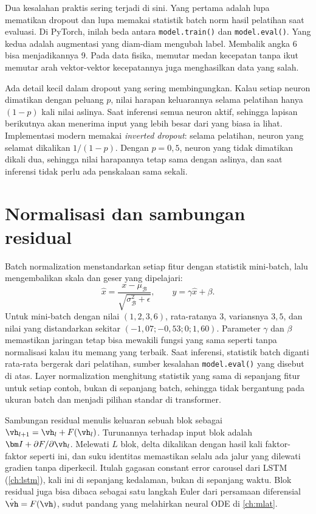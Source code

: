 Dua kesalahan praktis sering terjadi di sini. Yang pertama adalah lupa mematikan dropout dan lupa
memakai statistik batch norm hasil pelatihan saat evaluasi. Di PyTorch, inilah beda antara
\texttt{model.train()} dan \texttt{model.eval()}. Yang kedua adalah augmentasi yang diam-diam
mengubah label. Membalik angka 6 bisa menjadikannya 9. Pada data fisika, memutar medan kecepatan
tanpa ikut memutar arah vektor-vektor kecepatannya juga menghasilkan data yang salah.

Ada detail kecil dalam dropout yang sering membingungkan. Kalau setiap neuron dimatikan dengan peluang $p$, nilai harapan
keluarannya selama pelatihan hanya $(1-p)$ kali nilai aslinya. Saat inferensi semua neuron aktif, sehingga lapisan
berikutnya akan menerima input yang lebih besar dari yang biasa ia lihat. Implementasi modern memakai \emph{inverted
dropout}: selama pelatihan, neuron yang selamat dikalikan $1/(1-p)$. Dengan $p=0{,}5$, neuron yang tidak dimatikan dikali dua,
sehingga nilai harapannya tetap sama dengan aslinya, dan saat inferensi tidak perlu ada penskalaan sama sekali.

\section{Normalisasi dan sambungan residual}

Batch normalization \citep{ioffe2015} menstandarkan setiap fitur dengan statistik mini-batch, lalu mengembalikan skala dan
geser yang dipelajari:
\begin{equation}
\hat x=\frac{x-\mu_{\mathcal B}}{\sqrt{\sigma^2_{\mathcal B}+\epsilon}},\qquad y=\gamma\hat x+\beta .
\end{equation}
Untuk mini-batch dengan nilai $(1,2,3,6)$, rata-ratanya $3$, variansnya $3{,}5$, dan nilai yang distandarkan sekitar
$(-1{,}07;-0{,}53;0;1{,}60)$. Parameter $\gamma$ dan $\beta$ memastikan jaringan tetap bisa mewakili fungsi yang sama seperti
tanpa normalisasi kalau itu memang yang terbaik. Saat inferensi, statistik batch diganti rata-rata bergerak dari pelatihan,
sumber kesalahan \texttt{model.eval()} yang disebut di atas. Layer normalization menghitung statistik yang sama di sepanjang
fitur untuk setiap contoh, bukan di sepanjang batch, sehingga tidak bergantung pada ukuran batch dan menjadi pilihan standar
di transformer.

Sambungan residual \citep{he2016} menulis keluaran sebuah blok sebagai $\vh_{l+1}=\vh_l+F(\vh_l)$. Turunannya terhadap input
blok adalah $\bm I+\partial F/\partial\vh_l$. Melewati $L$ blok, delta dikalikan dengan hasil kali faktor-faktor seperti ini,
dan suku identitas memastikan selalu ada jalur yang dilewati gradien tanpa diperkecil. Itulah gagasan constant error
carousel dari LSTM (\cref{ch:lstm}), kali ini di sepanjang kedalaman, bukan di sepanjang waktu. Blok residual juga bisa dibaca
sebagai satu langkah Euler dari persamaan diferensial $\dot\vh=F(\vh)$, sudut pandang yang melahirkan neural ODE di
\cref{ch:mlat}.

